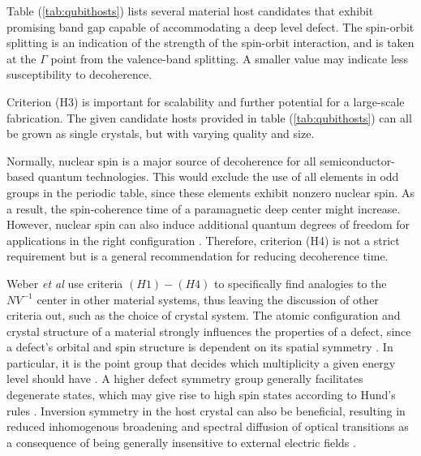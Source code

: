 Table (\ref{tab:qubithosts}) lists several material host candidates that exhibit promising band gap capable of accommodating a deep level defect. The spin-orbit splitting is an indication of the strength of the spin-orbit interaction, and is taken at the $\Gamma$ point from the valence-band splitting. A smaller value may indicate less susceptibility to decoherence.

Criterion (H3) is important for scalability and further potential for a large-scale fabrication. The given candidate hosts provided in table (\ref{tab:qubithosts}) can all be grown as single crystals, but with varying quality and size.

Normally, nuclear spin is a major source of decoherence for all semiconductor-based quantum technologies. This would exclude the use of all elements in odd groups in the periodic table, since these elements exhibit nonzero nuclear spin. As a result, the spin-coherence time of a paramagnetic deep center \cite{Weber2010} might increase. However, nuclear spin can also induce additional quantum degrees of freedom for applications in the right configuration \cite{Bassett2019}. Therefore, criterion (H4) is not a strict requirement but is a general recommendation for reducing decoherence time.  %


Weber \textit{et al} \cite{Weber2010} use criteria $(H1)-(H4)$ to specifically find analogies to the $NV^{-1}$ center in other material systems, thus leaving the discussion of other criteria out, such as the choice of crystal system. The atomic configuration and crystal structure of a material strongly influences the properties of a defect, since a defect's orbital and spin structure is dependent on its spatial symmetry \cite{Bassett2019}. In particular, it is the point group that decides which multiplicity a given energy level should have \cite{James1976}. A higher defect symmetry group generally facilitates degenerate states, which may give rise to high spin states according to Hund's rules \cite{Bassett2019, Togan2010}. Inversion symmetry in the host crystal can also be beneficial, resulting in reduced inhomogenous broadening and spectral diffusion of optical transitions as a consequence of being generally insensitive to external electric fields \cite{Bassett2019}.

